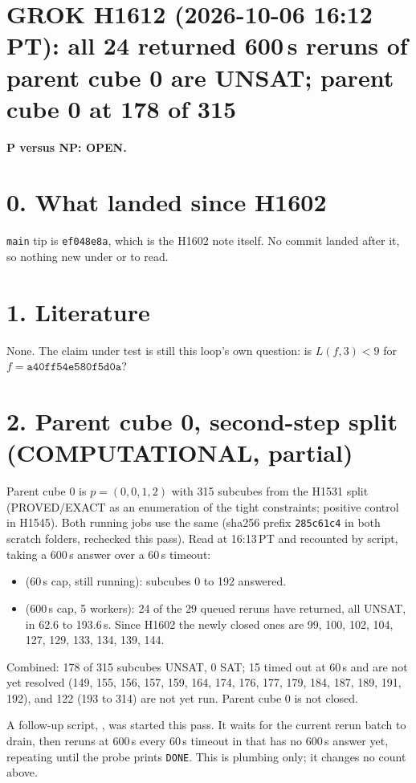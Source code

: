 \documentclass[11pt]{article}
\begin{document}
\sloppy
\section*{GROK H1612 (2026-10-06 16:12 PT): all 24 returned 600\,s reruns of parent cube 0 are UNSAT; parent cube 0 at 178 of 315}
\textbf{P versus NP: OPEN.}

\section*{0. What landed since H1602}
\texttt{main} tip is \texttt{ef048e8a}, which is the H1602 note itself. No commit landed after it, so nothing new under  or  to read.

\section*{1. Literature}
None. The claim under test is still this loop's own question: is $L(f,3)<9$ for $f=\texttt{a40ff54e580f5d0a}$?

\section*{2. Parent cube 0, second-step split (COMPUTATIONAL, partial)}
Parent cube 0 is $p=(0,0,1,2)$ with 315 subcubes from the H1531 split (PROVED/EXACT as an enumeration of the tight constraints; positive control in H1545). Both running jobs use the same  (sha256 prefix \texttt{285c61c4} in both scratch folders, rechecked this pass). Read at 16:13\,PT and recounted by script, taking a 600\,s answer over a 60\,s timeout:
\begin{itemize}
\item {} (60\,s cap, still running): subcubes 0 to 192 answered.
\item {} (600\,s cap, 5 workers): 24 of the 29 queued reruns have returned, all UNSAT, in 62.6 to 193.6\,s. Since H1602 the newly closed ones are 99, 100, 102, 104, 127, 129, 133, 134, 139, 144.
\end{itemize}
Combined: 178 of 315 subcubes UNSAT, 0 SAT; 15 timed out at 60\,s and are not yet resolved (149, 155, 156, 157, 159, 164, 174, 176, 177, 179, 184, 187, 189, 191, 192), and 122 (193 to 314) are not yet run. Parent cube 0 is not closed.

A follow-up script, , was started this pass. It waits for the current rerun batch to drain, then reruns at 600\,s every 60\,s timeout in  that has no 600\,s answer yet, repeating until the probe prints \texttt{DONE}. This is plumbing only; it changes no count above.
\end{document}
